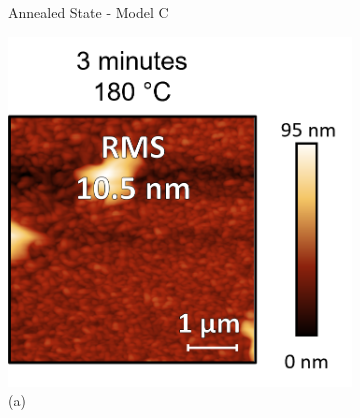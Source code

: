 \begin{figure}[htbp]
\begin{subfigure}[t]{0.45\textwidth}
        \caption{Annealed State - Model C}
        \label{fig:ellipsometry:static_fits:t23_fixed_thick_50_void}
    \end{subfigure}
    \caption{}
    \label{fig:ellipsometry:static_fits}
\end{figure}


\begin{figure}[htbp]
    \centering
    \begin{subfigure}[t]{0.4\textwidth}
        \centering
        \includegraphics[width=\textwidth]{chapters/ellipsometry/image/180C_3min.png} %
        \caption*{(a)}
    \end{subfigure}
    \hfill
    \begin{subfigure}[t]{0.4\textwidth}
        \centering

\end{subfigure}
\end{figure}
